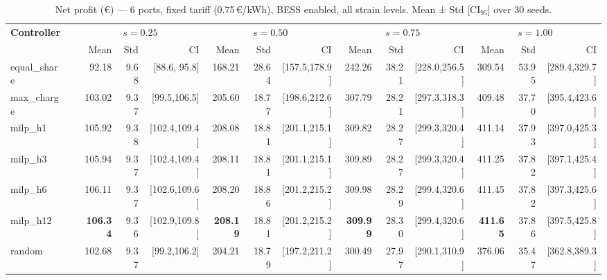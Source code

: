 \begin{table}[!htb]
\centering
\caption{Net profit (€) — 6 ports, fixed tariff (0.75\,€/kWh), BESS enabled,
         all strain levels. Mean ± Std [CI$_{95}$] over 30 seeds.}
\label{tab:gc_6port_fixed}
\setlength{\tabcolsep}{3pt}
\begin{tabular}{lp{1cm} rrr rrr rrr rrr}
\toprule
\textbf{Controller} & &
  \multicolumn{3}{c}{$s=0.25$} &
  \multicolumn{3}{c}{$s=0.50$} &
  \multicolumn{3}{c}{$s=0.75$} &
  \multicolumn{3}{c}{$s=1.00$} \\
\cmidrule(lr){3-5}\cmidrule(lr){6-8}\cmidrule(lr){9-11}\cmidrule(lr){12-14}
 & & Mean & Std & CI & Mean & Std & CI & Mean & Std & CI & Mean & Std & CI \\
\midrule
equal\_share & &  92.18 &  9.68 & [88.6, 95.8] & 168.21 & 28.64 & [157.5,178.9] & 242.26 & 38.21 & [228.0,256.5] & 309.54 & 53.95 & [289.4,329.7] \\
max\_charge  & & 103.02 &  9.37 & [99.5,106.5] & 205.60 & 18.77 & [198.6,212.6] & 307.79 & 28.21 & [297.3,318.3] & 409.48 & 37.70 & [395.4,423.6] \\
milp\_h1     & & 105.92 &  9.38 & [102.4,109.4] & 208.08 & 18.81 & [201.1,215.1] & 309.82 & 28.27 & [299.3,320.4] & 411.14 & 37.93 & [397.0,425.3] \\
milp\_h3     & & 105.94 &  9.37 & [102.4,109.4] & 208.11 & 18.81 & [201.1,215.1] & 309.89 & 28.27 & [299.3,320.4] & 411.25 & 37.82 & [397.1,425.4] \\
milp\_h6     & & 106.11 &  9.37 & [102.6,109.6] & 208.20 & 18.86 & [201.2,215.2] & 309.98 & 28.29 & [299.4,320.6] & 411.45 & 37.82 & [397.3,425.6] \\
milp\_h12    & & \textbf{106.34} &  9.36 & [102.9,109.8] & \textbf{208.19} & 18.81 & [201.2,215.2] & \textbf{309.99} & 28.30 & [299.4,320.6] & \textbf{411.65} & 37.86 & [397.5,425.8] \\
random       & & 102.68 &  9.37 & [99.2,106.2] & 204.21 & 18.79 & [197.2,211.2] & 300.49 & 27.97 & [290.1,310.9] & 376.06 & 35.47 & [362.8,389.3] \\
\bottomrule
\end{tabular}
\end{table}

